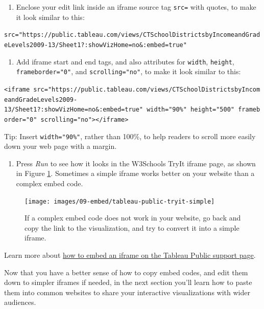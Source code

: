 \documentclass[
  english,
]{book}
\providecommand{\tightlist}{%
  \setlength{\itemsep}{0pt}\setlength{\parskip}{0pt}}
\begin{document}
\begin{enumerate}
\def\labelenumi{\arabic{enumi}.}
\setcounter{enumi}{4}
\tightlist
\item
  Enclose your edit link inside an iframe source tag \texttt{src=} with quotes, to make it look similar to this:
\end{enumerate}

\texttt{src="https://public.tableau.com/views/CTSchoolDistrictsbyIncomeandGradeLevels2009-13/Sheet1?:showVizHome=no\&:embed=true"}

\begin{enumerate}
\def\labelenumi{\arabic{enumi}.}
\setcounter{enumi}{5}
\tightlist
\item
  Add iframe start and end tags, and also attributes for \texttt{width}, \texttt{height}, \texttt{frameborder="0"}, and \texttt{scrolling="no"}, to make it look similar to this:
\end{enumerate}

\texttt{\textless{}iframe\ src="https://public.tableau.com/views/CTSchoolDistrictsbyIncomeandGradeLevels2009-13/Sheet1?:showVizHome=no\&:embed=true"\ width="90\%"\ height="500"\ frameborder="0"\ scrolling="no"\textgreater{}\textless{}/iframe\textgreater{}}

Tip: Insert \texttt{width="90\%"}, rather than 100\%, to help readers to scroll more easily down your web page with a margin.

\begin{enumerate}
\def\labelenumi{\arabic{enumi}.}
\setcounter{enumi}{6}
\tightlist
\item
  Press \emph{Run} to see how it looks in the W3Schools TryIt iframe page, as shown in Figure \ref{fig:tableau-public-tryit-simple}. Sometimes a simple iframe works better on your website than a complex embed code.
\end{enumerate}



\begin{figure}
\texttt{[image: images/09-embed/tableau-public-tryit-simple]} \caption{If a complex embed code does not work in your website, go back and copy the link to the visualization, and try to convert it into a simple iframe.}\label{fig:tableau-public-tryit-simple}
\end{figure}

Learn more about \href{https://kb.tableau.com/articles/howto/embedding-tableau-public-views-in-iframes}{how to embed an iframe on the Tableau Public support page}.

Now that you have a better sense of how to copy embed codes, and edit them down to simpler iframes if needed, in the next section you'll learn how to paste them into common websites to share your interactive visualizations with wider audiences.
\end{document}

